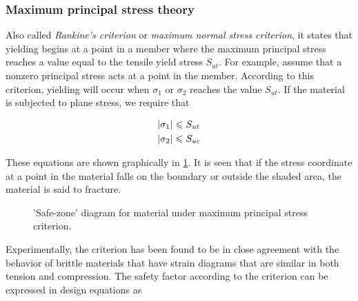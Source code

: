 \documentclass[a4paper,openany,nobib]{tufte-book}
\begin{document}
\subsubsection{Maximum principal stress theory}
\label{maximum-principal-stress-theory}
Also called \emph{Rankine's criterion} or \emph{maximum normal stress criterion},
it states that yielding begins at a point in a member where the maximum
principal stress reaches a value equal to the tensile yield stress
\(S_{ut}\). For example, assume that a nonzero principal stress acts at a
point in the member. According to this criterion, yielding will occur
when \(\sigma_1\) or \(\sigma_2\) reaches the value \(S_{ut}\). If the
material is subjected to plane stress, we require that

$$\begin{gathered}
    \left| \sigma _1 \right| \leqslant S_{ut} \hfill \\
    \left| \sigma _2 \right| \leqslant S_{uc} \hfill \\ 
  \end{gathered}$$

These equations are shown graphically in
\ref{fig: MNST safe zone}. It is seen that if the
stress coordinate at a point in the material falls on the boundary or
outside the shaded area, the material is said to fracture.

\begin{figure}[h]
  \centering
  \caption{'Safe-zone' diagram for material under maximum principal stress criterion.}
  \label{fig: MNST safe zone}
\end{figure}

Experimentally, the criterion has been found to be in close agreement
with the behavior of brittle materials that have strain diagrams that
are similar in both tension and compression. The safety factor according
to the criterion can be expressed in design equations as
\end{document}
